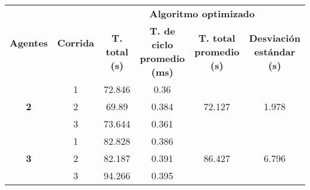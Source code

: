 \begin{table}[H]
	\centering
	\resizebox{\textwidth}{!} {
	\begin{tabular}{|c|c|llcc|}
		\hline
		\multirow{2}{*}{\textbf{Agentes}} & \multirow{2}{*}{\textbf{Corrida}} & \multicolumn{4}{c|}{\textbf{Algoritmo optimizado}}                                                                                                                                                        \\ \cline{3-6} 
		&                                   & \multicolumn{1}{c|}{\textbf{T. total (s)}} & \multicolumn{1}{c|}{\textbf{T. de ciclo promedio (ms)}} & \multicolumn{1}{c|}{\textbf{T. total promedio (s)}} & \textbf{Desviación estándar (s)} \\ \hline
		\multirow{3}{*}{\textbf{2}}       & 1                                 & \multicolumn{1}{c|}{72.846}                    & \multicolumn{1}{c|}{0.36}                                   & \multicolumn{1}{c|}{\multirow{3}{*}{72.127}}            & \multirow{3}{*}{1.978}           \\ \cline{2-4}
		& 2                                 & \multicolumn{1}{c|}{69.89}                     & \multicolumn{1}{c|}{0.384}                                  & \multicolumn{1}{c|}{}                                   &                                  \\ \cline{2-4}
		& 3                                 & \multicolumn{1}{c|}{73.644}                    & \multicolumn{1}{c|}{0.361}                                  & \multicolumn{1}{c|}{}                                   &                                  \\ \hline
		\multirow{3}{*}{\textbf{3}}       & 1                                 & \multicolumn{1}{c|}{82.828}                    & \multicolumn{1}{c|}{0.386}                                  & \multicolumn{1}{c|}{\multirow{3}{*}{86.427}}            & \multirow{3}{*}{6.796}           \\ \cline{2-4}
		& 2                                 & \multicolumn{1}{c|}{82.187}                    & \multicolumn{1}{c|}{0.391}                                  & \multicolumn{1}{c|}{}                                   &                                  \\ \cline{2-4}
		& 3                                 & \multicolumn{1}{c|}{94.266}                    & \multicolumn{1}{c|}{0.395}                                  & \multicolumn{1}{c|}{}                                   &                                  \\ \hline

\end{tabular}}
\end{table}
